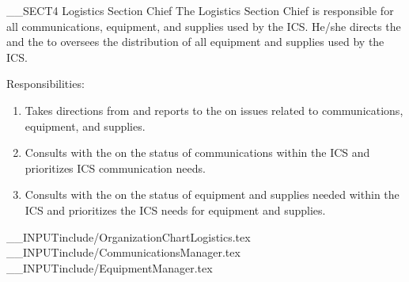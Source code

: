 __SECT4{ \Large Logistics Section Chief
\label{sec:LogisticsSectionChief} }
The Logistics Section Chief is responsible
for all communications, equipment, and supplies used by the ICS.
He/she directs the \CommunicationsManager and the \EquipmentManager
to oversees the distribution of all equipment and supplies used by the ICS.

Responsibilities:
\begin{enumerate}
\item Takes directions from and reports to the \IncidentCommander on issues related to communications, equipment, and supplies.
\item Consults with the \CommunicationsManager on the status of communications within the ICS and prioritizes ICS communication needs.
\item Consults with the \EquipmentManager on the status of equipment and supplies needed within the ICS and prioritizes the ICS needs for equipment and supplies.
\end{enumerate}
__INPUT{include/OrganizationChartLogistics.tex}
__INPUT{include/CommunicationsManager.tex}
__INPUT{include/EquipmentManager.tex}

